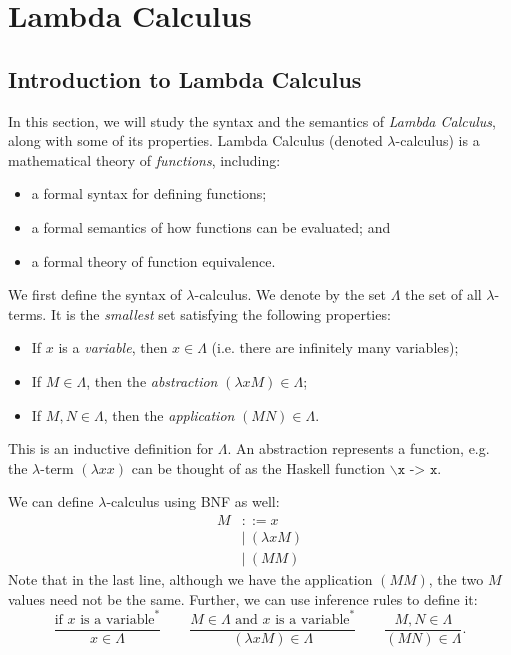\documentclass[a4paper, openany]{memoir}
\theoremstyle{definition}
\begin{document}
    \chapter{Lambda Calculus}
    \section{Introduction to Lambda Calculus}
    In this section, we will study the syntax and the semantics of \emph{Lambda Calculus}, along with some of its properties. Lambda Calculus (denoted $\lambda$-calculus) is a mathematical theory of \emph{functions}, including:
    \begin{itemize}
        \item a formal syntax for defining functions;
        \item a formal semantics of how functions can be evaluated; and
        \item a formal theory of function equivalence.
    \end{itemize}

    We first define the syntax of $\lambda$-calculus. We denote by the set $\Lambda$ the set of all $\lambda$-terms. It is the \emph{smallest} set satisfying the following properties:
    \begin{itemize}
        \item If $x$ is a \emph{variable}, then $x \in \Lambda$ (i.e. there are infinitely many variables);
        \item If $M \in \Lambda$, then the \emph{abstraction} $(\lambda x M) \in \Lambda$;
        \item If $M, N \in \Lambda$, then the \emph{application} $(MN) \in \Lambda$.
    \end{itemize}
    This is an inductive definition for $\Lambda$. An abstraction represents a function, e.g. the $\lambda$-term $(\lambda x x)$ can be thought of as the Haskell function $\backslash \texttt{x -> x}$. 
    
    We can define $\lambda$-calculus using BNF as well:
    \begin{align*}
        M &::= x \\
        &| \ (\lambda x M) \\
        &| \ (MM)
    \end{align*}
    Note that in the last line, although we have the application $(MM)$, the two $M$ values need not be the same. Further, we can use inference rules to define it:
    \[\frac{\textrm{if } x \textrm{ is a variable}^*}{x \in \Lambda} \qquad \frac{M \in \Lambda \textrm{ and } x \textrm{ is a variable}^*}{(\lambda x M) \in \Lambda} \qquad \frac{M, N \in \Lambda}{(MN) \in \Lambda}.\]
\end{document}
